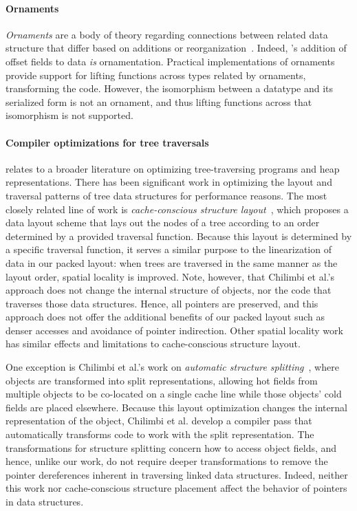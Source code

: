 \paragraph{Ornaments}

\emph{Ornaments} are a body of theory regarding connections between related
data structure that differ based on additions or
reorganization~\cite{ornaments}.
%
Indeed, \ourcalc's addition of offset fields to data {\em is} ornamentation.
%
Practical implementations of ornaments~\cite{ornament-ml} provide support for
lifting functions across types related by ornaments, transforming the code.
%
However, the isomorphism between a datatype and its serialized form is not an
ornament, and thus lifting functions across that isomorphism is not supported.


\paragraph{Compiler optimizations for tree traversals}

\ourcalc relates to a broader literature on optimizing
tree-traversing programs and heap representations.
%
There has been significant work in optimizing the layout and
traversal patterns of tree data structures for performance reasons.
%
The most closely related line of work is \emph{cache-conscious structure
  layout}~\cite{chilimbi1999}, which proposes a data layout scheme that lays out
the nodes of a tree according to an order determined by a provided traversal
function. Because this layout is determined by a specific traversal function,
it serves a similar purpose to the linearization of data in our packed layout:
when trees are traversed in the same manner as the layout order, spatial
locality is improved. Note, however, that Chilimbi et al.'s approach does not
change the internal structure of objects, nor the code that traverses those
data structures. Hence, all pointers are preserved, and this approach does not
offer the additional benefits of our packed layout such as denser accesses and
avoidance of pointer indirection. Other spatial locality
work~\cite{Truong1998,Lattner2005,Chilimbi1999a} has similar effects and
limitations to cache-conscious structure layout.

One exception is Chilimbi et al.'s work on {\em automatic structure
splitting}~\cite{Chilimbi1999b}, where objects are transformed into split
representations, allowing hot fields from multiple objects to be co-located on
a single cache line while those objects' cold fields are placed elsewhere.
Because this layout optimization changes the internal representation of the
object, Chilimbi et al. develop a compiler pass that automatically transforms
code to work with the split representation. The transformations for structure
splitting concern how to access object fields, and hence, unlike our work, do
not require deeper transformations to remove the pointer dereferences inherent
in traversing linked data structures. Indeed, neither this work nor
cache-conscious structure placement affect the behavior of pointers in data
structures.

